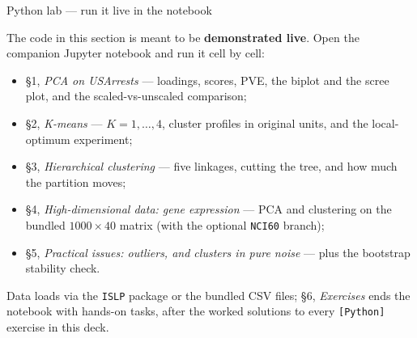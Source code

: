 \documentclass[aspectratio=169,11pt]{beamer}
\begin{document}
\begin{frame}{Python lab --- run it live in the notebook}
  \begin{labnote}
    The code in this section is meant to be \textbf{demonstrated live}. Open the companion
    Jupyter notebook and run it cell by cell:
    \begin{itemize}
      \item \S1, \emph{PCA on USArrests} --- loadings, scores, PVE, the biplot and the
            scree plot, and the scaled-vs-unscaled comparison;
      \item \S2, \emph{K-means} --- $K=1,\dots,4$, cluster profiles in original units, and
            the local-optimum experiment;
      \item \S3, \emph{Hierarchical clustering} --- five linkages, cutting the tree, and
            how much the partition moves;
      \item \S4, \emph{High-dimensional data: gene expression} --- PCA and clustering on the
            bundled $1000\times40$ matrix (with the optional \texttt{NCI60} branch);
      \item \S5, \emph{Practical issues: outliers, and clusters in pure noise} --- plus the
            bootstrap stability check.
    \end{itemize}
    Data loads via the \texttt{ISLP} package or the bundled CSV files; \S6,
    \emph{Exercises} ends the notebook with hands-on tasks, after the worked solutions to
    every \texttt{[Python]} exercise in this deck.
  \end{labnote}
\end{frame}
\end{document}
